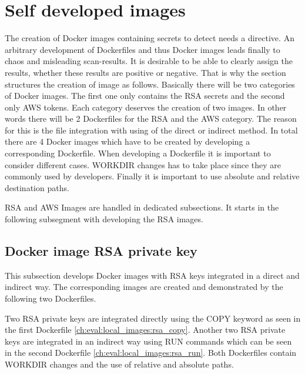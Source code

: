 \section{Self developed images}
\label{ch:eval:local_images}
The creation of Docker images containing secrets to detect needs a directive. An arbitrary development of Dockerfiles and thus Docker images leads finally to chaos and misleading scan-results. 
It is desirable to be able to clearly assign the results, whether these results are positive or negative. That is why the section structures the creation of image as follows. Basically there will be two categories of Docker images. The first one only contains the RSA secrets and the second only AWS tokens. Each category deserves the creation of two images. In other words there will be 2 Dockerfiles for the RSA and the AWS category. The reason for this is the file integration with using of the direct or indirect method. In total there are 4 Docker images which have to be created by developing a corresponding Dockerfile. When developing a Dockerfile it is important to consider different cases. WORKDIR changes has to take place since they are commonly used by developers. Finally it is important to use absolute and relative destination paths. 

RSA and AWS Images are handled in dedicated subsections. It starts in the following subsegment with developing the RSA images.

\subsection{Docker image RSA private key}
\label{ch:eval:local_images:rsa}
This subsection develops Docker images with RSA keys integrated in a direct and indirect way. The corresponding images are created and demonstrated by the following two Dockerfiles.


Two RSA private keys are integrated directly using the COPY keyword as seen in the first Dockerfile \ref{ch:eval:local_images:rsa_copy}. Another two RSA private keys are integrated in an indirect way using RUN commands which can be seen in the second Dockerfile \ref{ch:eval:local_images:rsa_run}. Both Dockerfiles contain WORKDIR changes and the use of relative and absolute paths. 

